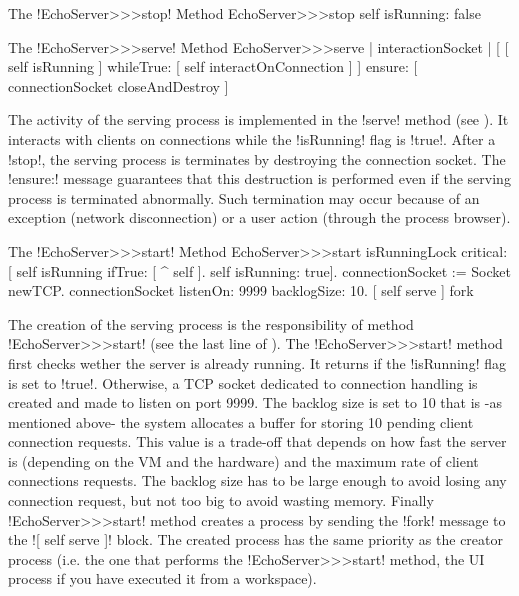 \documentclass[a4paper,10pt,twoside]{book}
\begin{document}
\begin{method}{The \ct!EchoServer>>>stop! Method}
EchoServer>>>stop
	self isRunning: false
\end{method}

\begin{method}{The \ct!EchoServer>>>serve! Method}
EchoServer>>>serve
	| interactionSocket |
	[ [ self isRunning ]
		whileTrue: [ self interactOnConnection ] ]
		ensure: [ connectionSocket closeAndDestroy ]
\end{method}

The activity of the serving process is implemented in the \ct!serve! method (see ).
It interacts with clients on connections while the \ct!isRunning! flag is \ct!true!.
After a \ct!stop!, the serving process is terminates by destroying the connection socket.
The \ct!ensure:! message guarantees that this destruction is performed even if the serving process is terminated abnormally. 
Such termination may occur because of an exception (\eg network disconnection) or a user action (\eg through the process browser).   

\begin{method}{The \ct!EchoServer>>>start! Method}
EchoServer>>>start
	isRunningLock critical: [
		self isRunning ifTrue: [ ^ self ].
		self isRunning: true].
	connectionSocket := Socket newTCP.
	connectionSocket listenOn: 9999 backlogSize: 10.
	[ self serve ] fork
\end{method}

The creation of the serving process is the responsibility of method \ct!EchoServer>>>start! (see the last line of ).
The \ct!EchoServer>>>start! method first checks wether the server is already running.
It returns if the \ct!isRunning! flag is set to \ct!true!.
Otherwise, a TCP socket dedicated to connection handling is created and made to listen on port 9999.
The backlog size is set to 10 that is -as mentioned above- the system allocates a buffer for storing 10 pending client connection requests.
This value is a trade-off that depends on how fast the server is (depending on the VM and the hardware) and the maximum rate of client connections requests.
The backlog size has to be large enough to avoid losing any connection request, but not too big to avoid wasting memory.
Finally \ct!EchoServer>>>start! method creates a process by sending the \ct!fork! message to the \ct![ self serve ]! block.
The created process has the same priority as the creator process (i.e. the one that performs the \ct!EchoServer>>>start! method, the UI process if you have executed it from a workspace).
\end{document}

